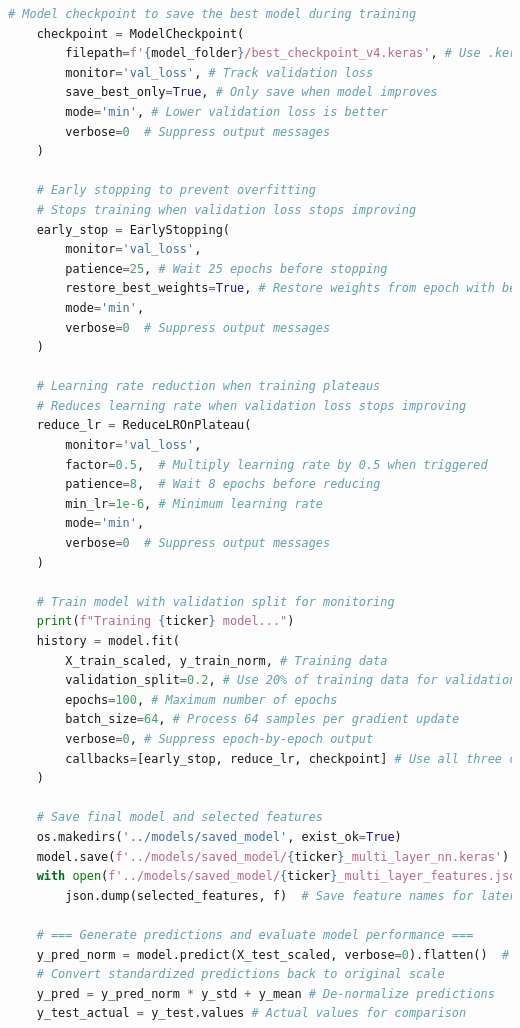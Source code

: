 \documentclass[12pt]{article}
\begin{document}
\begin{lstlisting}[language=Python]
    # Model checkpoint to save the best model during training
    checkpoint = ModelCheckpoint(
        filepath=f'{model_folder}/best_checkpoint_v4.keras', # Use .keras format instead of .h5
        monitor='val_loss', # Track validation loss
        save_best_only=True, # Only save when model improves
        mode='min', # Lower validation loss is better
        verbose=0  # Suppress output messages
    )
    
    # Early stopping to prevent overfitting
    # Stops training when validation loss stops improving
    early_stop = EarlyStopping(
        monitor='val_loss',
        patience=25, # Wait 25 epochs before stopping
        restore_best_weights=True, # Restore weights from epoch with best validation loss
        mode='min',
        verbose=0  # Suppress output messages
    )
    
    # Learning rate reduction when training plateaus
    # Reduces learning rate when validation loss stops improving
    reduce_lr = ReduceLROnPlateau(
        monitor='val_loss',
        factor=0.5,  # Multiply learning rate by 0.5 when triggered
        patience=8,  # Wait 8 epochs before reducing
        min_lr=1e-6, # Minimum learning rate
        mode='min',
        verbose=0  # Suppress output messages
    )
    
    # Train model with validation split for monitoring
    print(f"Training {ticker} model...")
    history = model.fit(
        X_train_scaled, y_train_norm, # Training data
        validation_split=0.2, # Use 20% of training data for validation
        epochs=100, # Maximum number of epochs
        batch_size=64, # Process 64 samples per gradient update
        verbose=0, # Suppress epoch-by-epoch output
        callbacks=[early_stop, reduce_lr, checkpoint] # Use all three callbacks
    )

    # Save final model and selected features
    os.makedirs('../models/saved_model', exist_ok=True)
    model.save(f'../models/saved_model/{ticker}_multi_layer_nn.keras') # Use .keras format
    with open(f'../models/saved_model/{ticker}_multi_layer_features.json', 'w') as f:
        json.dump(selected_features, f)  # Save feature names for later use
        
    # === Generate predictions and evaluate model performance ===
    y_pred_norm = model.predict(X_test_scaled, verbose=0).flatten()  # Suppress prediction output
    # Convert standardized predictions back to original scale
    y_pred = y_pred_norm * y_std + y_mean # De-normalize predictions
    y_test_actual = y_test.values # Actual values for comparison


\end{lstlisting}
\end{document}
